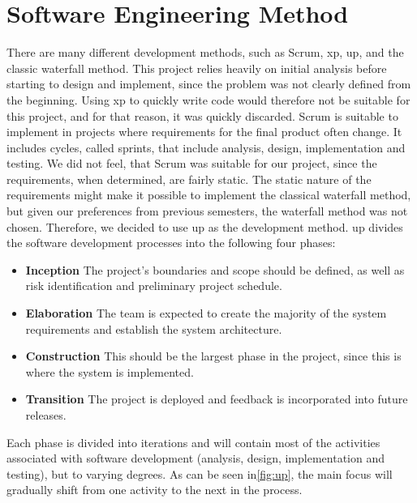 \section{Software Engineering Method}
\label{sec:software_engineering_method}

There are many different development methods, such as Scrum, \ac{xp}, \ac{up}, and the classic waterfall method.
This project relies heavily on initial analysis before starting to design and implement, since the problem was not clearly defined from the beginning.
Using \ac{xp} to quickly write code would therefore not be suitable for this project, and for that reason, it was quickly discarded.
Scrum is suitable to implement in projects where requirements for the final product often change.
It includes cycles, called sprints, that include analysis, design, implementation and testing.
We did not feel, that Scrum was suitable for our project, since the requirements, when determined, are fairly static.
The static nature of the requirements might make it possible to implement the classical waterfall method, but given our preferences from previous semesters, the waterfall method was not chosen.
Therefore, we decided to use \ac{up} as the development method.
\ac{up} divides the software development processes into the following four phases: 

\begin{itemize}
\item \textbf{Inception} The project's boundaries and scope should be defined, as well as risk identification and preliminary project schedule.
\item \textbf{Elaboration} The team is expected to create the majority of the system requirements and establish the system architecture.
\item \textbf{Construction} This should be the largest phase in the project, since this is where the system is implemented.
\item \textbf{Transition} The project is deployed and feedback is incorporated into future releases.
\end{itemize}

Each phase is divided into iterations and will contain most of the activities associated with software development (analysis, design, implementation and testing), but to varying degrees. As can be seen in\autoref{fig:up}, the main focus will gradually shift from one activity to the next in the process.

